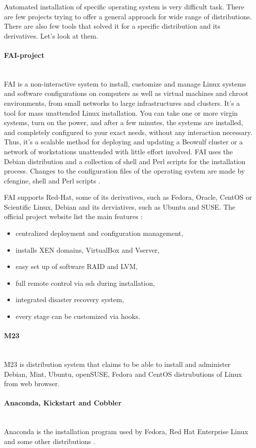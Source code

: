 \documentclass[thesis=B,english]{FITthesis}[2013/04/26]
\newcommand{\myparagraph}[1]{\paragraph{#1}\mbox{}\\}
\begin{document}
Automated installation of specific operating system is very difficult task. There are few projects trying to offer a general approach for wide range of distributions. There are also few tools that solved it for a specific distribution and its derivatives. Let's look at them.

\myparagraph{FAI-project}

FAI is a non-interactive system to install, customize and manage Linux
systems and software configurations on computers as well as virtual
machines and chroot environments, from small networks to large
infrastructures and clusters. It's a tool for mass unattended Linux
installation. You can take one or more virgin systems, turn on the
power, and after a few minutes, the systems are installed, and
completely configured to your exact needs, without any interaction
necessary. Thus, it's a scalable method for deploying and updating a
Beowulf cluster or a network of workstations unattended with little
effort involved. FAI uses the Debian distribution and a collection of
shell and Perl scripts for the installation process. Changes to the
configuration files of the operating system are made by cfengine,
shell and Perl scripts \cite{fai_about}.

FAI supports Red-Hat, some of its derivatives, such as Fedora, Oracle, CentOS or Scientific Linux, Debian and its derviatives, such as Ubuntu and SUSE. The official project website list the main features \cite{fai_home}:

\begin{itemize}
	\item centralized deployment and configuration management,
	\item installs XEN domains, VirtualBox and Vserver,
	\item easy set up of software RAID and LVM,
	\item full remote control via ssh during installation,
	\item integrated disaster recovery system,
	\item every stage can be customized via hooks.
\end{itemize}

\myparagraph{M23}

M23 is distribution system that claims to be able to install and administer Debian, Mint, Ubuntu, openSUSE, Fedora and CentOS distrubutions of Linux from web browser. \cite{m23}

\myparagraph{Anaconda, Kickstart and Cobbler}

Anaconda is the installation program used by Fedora, Red Hat Enterprise Linux and some other distributions \cite{anaconda}.
\end{document}
